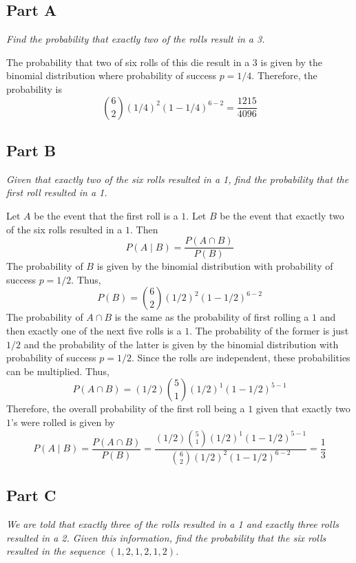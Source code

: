 \documentclass{article}
\begin{document}
\subsection*{Part A}

\textit{Find the probability that exactly two of the rolls result in a 3.}

\bigbreak

The probability that two of six rolls of this die result in a 3 is given by
the binomial distribution where probability of success $ p = 1/4 $. Therefore,
the probability is
$$ \binom{6}{2} (1/4)^2 (1 - 1/4)^{6 - 2} = \frac{1215}{4096} $$

\subsection*{Part B}

\textit{Given that exactly two of the six rolls resulted in a 1, find the
probability that the first roll resulted in a 1.}

\bigbreak

Let $ A $ be the event that the first roll is a $ 1 $. Let $ B $ be the event
that exactly two of the six rolls resulted in a $ 1 $. Then
$$ P(A \mid B) = \frac{P(A \cap B)}{P(B)} $$
The probability of $ B $ is given by the binomial distribution with
probability of success $ p = 1/2 $. Thus,
$$ P(B) = \binom{6}{2} (1/2)^2 (1-1/2)^{6 - 2} $$
The probability of $ A \cap B $ is the same as the probability of first
rolling a $ 1 $ and then exactly one of the next five rolls is a $ 1 $.
The probability of the former is just $ 1/2 $ and the probability of the
latter is given by the binomial distribution with probability of success $ p
= 1/2 $. Since the rolls are independent, these probabilities can be
multiplied. Thus,
$$ P(A \cap B) = (1/2) \binom{5}{1} (1/2)^1 (1 - 1/2)^{5 - 1} $$
Therefore, the overall probability of the first roll being a $ 1 $ given that
exactly two $ 1 $'s were rolled is given by
$$ P(A \mid B) = \frac{P(A \cap B)}{P(B)} = \frac{(1/2) \binom{5}{1} (1/2)^1
(1 - 1/2)^{5 - 1}}{\binom{6}{2} (1/2)^2 (1-1/2)^{6 - 2}} = \frac{1}{3} $$

\subsection*{Part C}

\textit{We are told that exactly three of the rolls resulted in a 1 and
exactly three rolls resulted in a 2. Given this information, find the
probability that the six rolls resulted in the sequence $ (1, 2, 1, 2, 1, 2)
$.}
\end{document}
